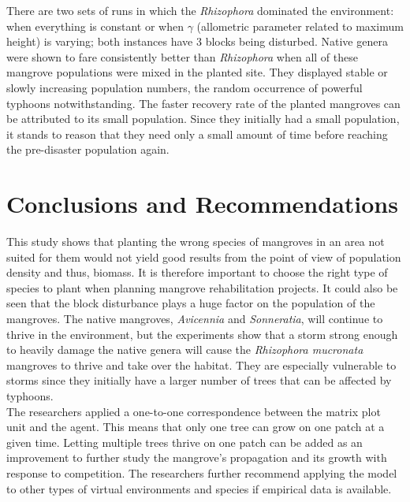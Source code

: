 There are two sets of runs in which the \emph{Rhizophora} dominated the
environment: when everything is constant or when $\gamma$ (allometric parameter
related to maximum height) is varying; both instances have 3 blocks
being disturbed. Native genera were shown to fare consistently better
than \emph{Rhizophora} when all of these mangrove populations were mixed
in the planted site. They displayed stable or slowly increasing
population numbers, the random occurrence of powerful typhoons
notwithstanding. The faster recovery rate of the planted mangroves can
be attributed to its small population. Since they initially had a small
population, it stands to reason that they need only a small amount of
time before reaching the pre-disaster population again.

\section{Conclusions and
Recommendations}\label{conclusions-and-recommendations}

This study shows that planting the wrong species of mangroves in an area not
suited for them would not yield good results from the point of view of
population density and thus, biomass. It is therefore important to
choose the right type of species to plant when planning mangrove
rehabilitation projects. It could also be seen that the block
disturbance plays a huge factor on the population of the mangroves. The
native mangroves, \emph{Avicennia} and \emph{Sonneratia}, will continue
to thrive in the environment, but the experiments show that a storm
strong enough to heavily damage the native genera will cause the
\emph{Rhizophora mucronata} mangroves to thrive and take over the
habitat. They are especially vulnerable to storms since they initially
have a larger number of trees that can be affected by typhoons.\\
The researchers applied a one-to-one correspondence between the matrix
plot unit and the agent. This means that only one tree can grow on one
patch at a given time. Letting multiple trees thrive on one patch can be
added as an improvement to further study the mangrove's propagation and
its growth with response to competition. The researchers further
recommend applying the model to other types of virtual environments and
species if empirical data is available.